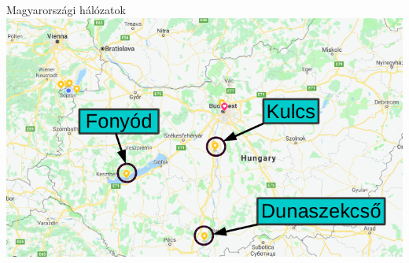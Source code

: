 \documentclass{beamer}
\begin{document}
\begin{frame}{Magyarországi hálózatok}
\includegraphics[width=\textwidth]{hungary_networks.png}
\end{frame}
\end{document}

